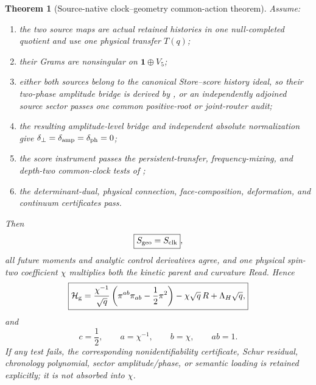 \documentclass[11pt]{article}
\newtheorem{theorem}{Theorem}[section]
\theoremstyle{definition}
\theoremstyle{remark}
\begin{document}
\begin{theorem}[Source-native clock--geometry common-action theorem]
\label{thm:Clifford-common-action-master}
Assume:
\begin{enumerate}[label=\textup{(A\arabic*)},leftmargin=3em]
\item the two source maps are actual retained histories in one null-completed
      quotient and use one physical transfer $T(q)$;
\item their Grams are nonsingular on $\mathbf1\oplus V_5$;
\item either both sources belong to the canonical Store--score history ideal,
      so their two-phase amplitude bridge is derived by
      , or an independently adjoined
      source sector passes one common positive-root or joint-router audit;
\item the resulting amplitude-level bridge and independent absolute
      normalization give
      $\delta_\perp=\delta_{\rm amp}=\delta_{\rm ph}=0$;
\item the score instrument passes the persistent-transfer, frequency-mixing,
      and depth-two common-clock tests of
      ;
\item the determinant-dual, physical connection, face-composition,
      deformation, and continuum certificates pass.
\end{enumerate}
Then
\[
 \boxed{S_{\rm geo}=S_{\rm clk}},
\]
all future moments and analytic control derivatives agree, and one physical
spin-two coefficient $\chi$ multiplies both the kinetic parent and curvature
Read.  Hence
\[
 \boxed{
 \mathcal H_{\rm g}
 =\frac{\chi^{-1}}{\sqrt q}
  \left(\pi^{ab}\pi_{ab}-\frac12\pi^2\right)
 -\chi\sqrt q\,R+\Lambda_H\sqrt q,}
\]
and
\[
 \boxed{c=\frac12,\qquad a=\chi^{-1},\qquad b=\chi,\qquad ab=1.}
\]
If any test fails, the corresponding nonidentifiability certificate, Schur
residual, chronology polynomial, sector amplitude/phase, or semantic loading is
retained explicitly; it is not absorbed into $\chi$.
\end{theorem}
\end{document}
